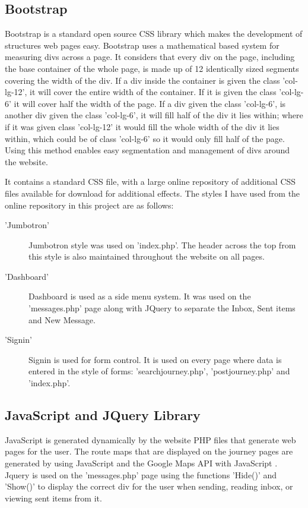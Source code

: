 	\subsection{Bootstrap}
		Bootstrap\cite{bootstrap_css} is a standard open source CSS library which makes the development of structures web pages easy. Bootstrap uses a mathematical based system for measuring divs across a page. It considers that every div on the page, including the base container of the whole page, is made up of 12 identically sized segments covering the width of the div. If a div inside the container is given the class 'col-lg-12', it will cover the entire width of the container. If it is given the class 'col-lg-6' it will cover half the width of the page. If a div given the class 'col-lg-6', is another div given the class 'col-lg-6', it will fill half of the div it lies within; where if it was given class 'col-lg-12' it would fill the whole width of the div it lies within, which could be of class 'col-lg-6' so it would only fill half of the page. Using this method enables easy segmentation and management of divs around the website.
		
		It contains a standard CSS file, with a large online repository of additional CSS files available for download for additional effects. The styles I have used from the online repository in this project are as follows:
		\begin{description}
		\item['Jumbotron'] Jumbotron\cite{bootstrap_jumbotron} style was used on 'index.php'. The header across the top from this style is also maintained throughout the website on all pages.
		\item['Dashboard'] Dashboard\cite{bootstrap_dashboard} is used as a side menu system. It was used on the 'messages.php' page along with JQuery to separate the Inbox, Sent items and New Message.
		\item['Signin'] Signin\cite{bootstrap_signin} is used for form control. It is used on every page where data is entered in the style of forms: 'search\textunderscore journey.php', 'post\textunderscore journey.php' and 'index.php'.
		\end{description}
	\subsection{JavaScript and JQuery Library}
		JavaScript is generated dynamically by the website PHP files that generate web pages for the user. The route maps that are displayed on the journey pages are generated by using JavaScript and the Google Maps API with JavaScript \cite{google_maps_javascript_api}. Jquery is used on the 'messages.php' page using the functions 'Hide()' and 'Show()' to display the correct div for the user when sending, reading inbox, or viewing sent items from it.

